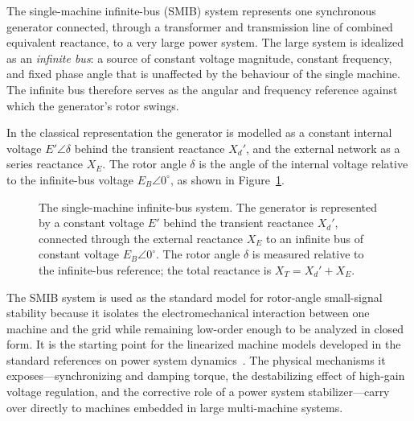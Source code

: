 \documentclass[12pt,a4paper]{article}
\begin{document}
The single-machine infinite-bus (SMIB) system represents one synchronous
generator connected, through a transformer and transmission line of combined
equivalent reactance, to a very large power system. The large system is
idealized as an \emph{infinite bus}: a source of constant voltage magnitude,
constant frequency, and fixed phase angle that is unaffected by the behaviour of
the single machine. The infinite bus therefore serves as the angular and
frequency reference against which the generator's rotor swings.

In the classical representation the generator is modelled as a constant internal
voltage $E'\angle\delta$ behind the transient reactance $X_d'$, and the external
network as a series reactance $X_E$. The rotor angle $\delta$ is the angle of the
internal voltage relative to the infinite-bus voltage $E_B\angle 0^\circ$, as
shown in Figure~\ref{fig:smib}.

\begin{figure}[H]
\centering
{}
\caption{The single-machine infinite-bus system. The generator is represented by
a constant voltage $E'$ behind the transient reactance $X_d'$, connected through
the external reactance $X_E$ to an infinite bus of constant voltage
$E_B\angle 0^\circ$. The rotor angle $\delta$ is measured relative to the
infinite-bus reference; the total reactance is $X_T = X_d' + X_E$.}
\label{fig:smib}
\end{figure}

The SMIB system is used as the standard model for rotor-angle small-signal
stability because it isolates the electromechanical interaction between one
machine and the grid while remaining low-order enough to be analyzed in closed
form. It is the starting point for the linearized machine models developed in
the standard references on power system dynamics~\cite{kundur,anderson,sauer}.
The physical mechanisms it exposes---synchronizing and damping
torque, the destabilizing effect of high-gain voltage regulation, and the
corrective role of a power system stabilizer---carry over directly to machines
embedded in large multi-machine systems.
\end{document}
